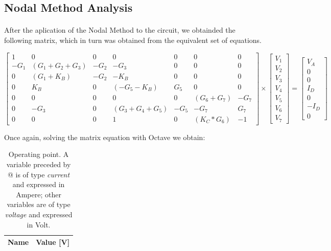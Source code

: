 \subsection{Nodal Method Analysis}

\paragraph{} After the aplication of the Nodal Method to the circuit, we obtainded the following matrix, which in turn was obtained from the equivalent set of equations.

\begin{equation}
\begin{bmatrix}
	1 & 0 & 0 & 0 & 0 & 0 & 0 \\
	-G_1 & (G_1 + G_2+G_3) & -G_2 & -G_3 & 0 & 0 & 0 \\
	0 & (G_1 + K_B) & -G_2 & -K_B & 0 & 0 & 0 \\
	0 & K_B & 0 & (-G_5 - K_B) & G_5 & 0 & 0 \\
	0 & 0 & 0 & 0 & 0 & (G_6 + G_7) & -G_7 \\
	0 & -G_3 & 0 & (G_3 + G_4 + G_5) & -G_5 & -G_7 & G_7 \\
	0 & 0 & 0 & 1 & 0 & (K_C * G_6) & -1
\end{bmatrix}
\times
\begin{bmatrix}
	V_1 \\
	V_2 \\
	V_3 \\
	V_4 \\
	V_5 \\
	V_6 \\
	V_7
\end{bmatrix}
=
\begin{bmatrix}
	V_A \\
	0 \\
	0 \\
	I_D \\
	0 \\
	-I_D \\
	0
	\label{m:2}
\end{bmatrix}
\end{equation}

Once again, solving the matrix equation with Octave we obtain:

\begin{table}[th!]
  \centering
  \begin{tabular}{|l|r|}
    \hline    
    {\bf Name} & {\bf Value [V]} \\ \hline
    
  \end{tabular}
  \caption{Operating point. A variable preceded by @ is of type {\em current}
    and expressed in Ampere; other variables are of type {\it voltage} and expressed in
    Volt.}
  \label{tab:op}
\end{table}

